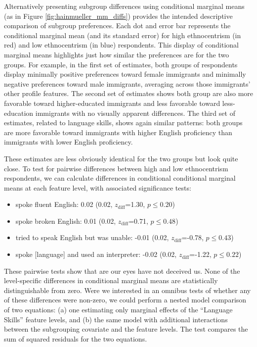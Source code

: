 \documentclass[a4paper,12pt]{article}\usepackage[]{graphicx}\usepackage[]{color}
\begin{document}
Alternatively presenting subgroup differences using conditional marginal means (as in Figure \ref{fig:hainmueller_mm_diffs}) provides the intended descriptive comparison of subgroup preferences. Each dot and error bar represents the conditional marginal mean (and its standard error) for high ethnocentrism (in red) and low ethnocentrism (in blue) respondents. This display of conditional marginal means highlights just how similar the preferences are for the two groups. For example, in the first set of estimates, both groups of respondents display minimally positive preferences toward female immigrants and minimally negative preferences toward male immigrants, averaging across those immigrants' other profile features. The second set of estimates shows both group are also more favorable toward higher-educated immigrants and less favorable toward less-education immigrants with no visually apparent differences. The third set of estimates, related to language skills, shows again similar patterns: both groups are more favorable toward immigrants with higher English proficiency than immigrants with lower English proficiency.

These estimates are less obviously identical for the two groups but look quite close. To test for pairwise differences between high and low ethnocentrism respondents, we can calculate differences in conditional conditional marginal means at each feature level, with associated significance tests:

\begin{itemize}
\item spoke fluent English: 0.02 (0.02, $z_{\text{diff}}$=1.30, $p\leq 0.20$)
\item spoke broken English: 0.01 (0.02, $z_{\text{diff}}$=0.71, $p\leq 0.48$)
\item tried to speak English but was unable: -0.01 (0.02, $z_{\text{diff}}$=-0.78, $p\leq 0.43$)
\item spoke [language] and used an interpreter: -0.02 (0.02, $z_{\text{diff}}$=-1.22, $p\leq 0.22$)

\end{itemize}



\noindent These pairwise tests show that are our eyes have not deceived us. None of the level-specific differences in conditional marginal means are statistically distinguishable from zero. Were we interested in an omnibus tests of whether any of these differences were non-zero, we could perform a nested model comparison of two equations: (a) one estimating only marginal effects of the ``Language Skills'' feature levels, and (b) the same model with additional interactions between the subgrouping covariate and the feature levels. The test compares the sum of squared residuals for the two equations.
\end{document}
